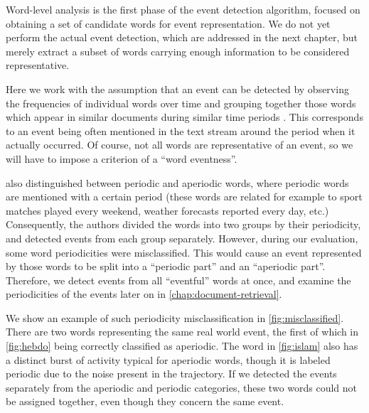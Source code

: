 Word-level analysis is the first phase of the event detection algorithm, focused on obtaining a set of candidate words for event representation. We do not yet perform the actual event detection, which are addressed in the next chapter, but merely extract a subset of words carrying enough information to be considered representative.

Here we work with the assumption that an event can be detected by observing the frequencies of individual words over time and grouping together those words which appear in similar documents during similar time periods \citep{event-detection, parameter-free}. This corresponds to an event being often mentioned in the text stream around the period when it actually occurred. Of course, not all words are representative of an event, so we will have to impose a criterion of a ``word eventness''.

\cite{event-detection} also distinguished between periodic and aperiodic words, where periodic words are mentioned with a certain period (these words are related for example to sport matches played every weekend, weather forecasts reported every day, etc.) Consequently, the authors divided the words into two groups by their periodicity, and detected events from each group separately. However, during our evaluation, some word periodicities were misclassified. This would cause an event represented by those words to be split into a ``periodic part'' and an ``aperiodic part''. Therefore, we detect events from all ``eventful'' words at once, and examine the periodicities of the events later on in \autoref{chap:document-retrieval}.

We show an example of such periodicity misclassification in \autoref{fig:misclassified}. There are two words representing the same real world event, the first of which in \autoref{fig:hebdo} being correctly classified as aperiodic. The word in \autoref{fig:islam} also has a distinct burst of activity typical for aperiodic words, though it is labeled periodic due to the noise present in the trajectory. If we detected the events separately from the aperiodic and periodic categories, these two words could not be assigned together, even though they concern the same event.

